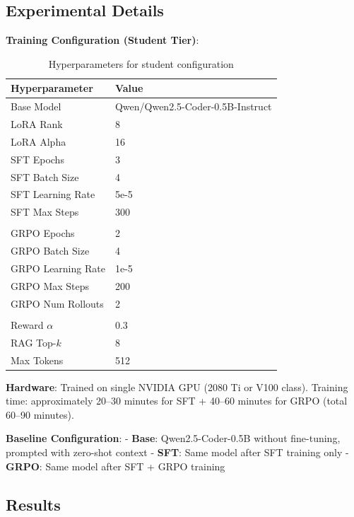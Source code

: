 \documentclass{article} %
\begin{document}
\subsection{Experimental Details}

\textbf{Training Configuration (Student Tier)}:

\begin{table}[t]
\caption{Hyperparameters for student configuration}
\label{tab:hyperparams}
\begin{center}
\begin{tabular}{ll}
\hline
\textbf{Hyperparameter} & \textbf{Value} \\
\hline
Base Model & Qwen/Qwen2.5-Coder-0.5B-Instruct \\
LoRA Rank & 8 \\
LoRA Alpha & 16 \\
SFT Epochs & 3 \\
SFT Batch Size & 4 \\
SFT Learning Rate & 5e-5 \\
SFT Max Steps & 300 \\
\\
GRPO Epochs & 2 \\
GRPO Batch Size & 4 \\
GRPO Learning Rate & 1e-5 \\
GRPO Max Steps & 200 \\
GRPO Num Rollouts & 2 \\
\\
Reward $\alpha$ & 0.3 \\
RAG Top-$k$ & 8 \\
Max Tokens & 512 \\
\hline
\end{tabular}
\end{center}
\end{table}

\textbf{Hardware}: Trained on single NVIDIA GPU (2080 Ti or V100 class). Training time: approximately 20--30 minutes for SFT + 40--60 minutes for GRPO (total 60--90 minutes).

\textbf{Baseline Configuration}:
- \textbf{Base}: Qwen2.5-Coder-0.5B without fine-tuning, prompted with zero-shot context
- \textbf{SFT}: Same model after SFT training only
- \textbf{GRPO}: Same model after SFT + GRPO training

\subsection{Results}
\end{document}

